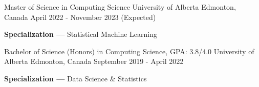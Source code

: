 
\begin{cventries}
  \cventry
    {Master of Science in Computing Science} %
    {University of Alberta} %
    {Edmonton, Canada} %
    {April 2022 - November 2023 (Expected)} %
    {
      \begin{cvitems}
        \item {\textbf{Specialization ---} Statistical Machine Learning}
      \end{cvitems}
    }
    
  \cventry
    {Bachelor of Science (Honors) in Computing Science, GPA: 3.8/4.0} %
    {University of Alberta} %
    {Edmonton, Canada} %
    {September 2019 - April 2022} %
    {
      \begin{cvitems} %
         \item {\textbf{Specialization ---} Data Science \& Statistics}
      \end{cvitems}
    }
\end{cventries}
